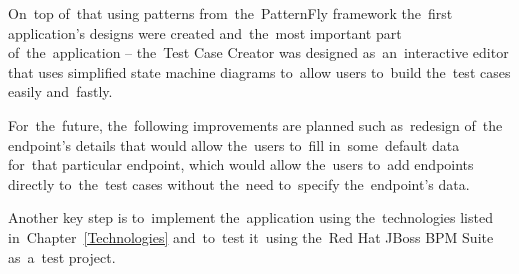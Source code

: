 On~top of~that using patterns from~the~PatternFly framework the~first
application's designs were created and~the~most important part
of~the~application -- the~Test Case Creator was designed as~an~interactive
editor that uses simplified state machine diagrams to~allow users to~build the~test
cases easily and~fastly.

For~the~future, the~following improvements are planned such as~redesign of~the
endpoint's details that would allow the~users to~fill in~some~default data
for~that particular endpoint, which would allow the~users to~add endpoints
directly to~the~test cases without the~need to~specify the~endpoint's data.

Another key step is to~implement the~application using the~technologies listed
in~Chapter~\ref{Technologies} and~to~test it~using the~Red Hat JBoss BPM Suite
as~a~test project.



